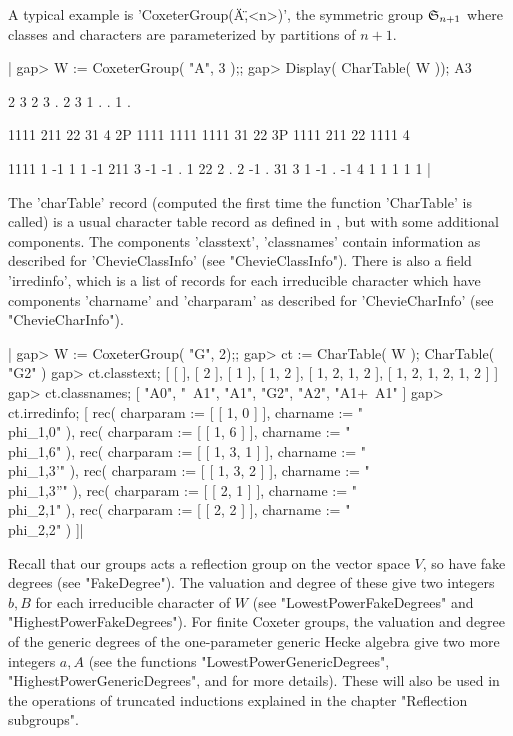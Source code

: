 A   typical  example  is  'CoxeterGroup(\"A\",<n>)',  the  symmetric  group
${\mathfrak S}_{n+1}$  where classes and characters  are parameterized by partitions
of $n+1$.

|    gap> W := CoxeterGroup( "A", 3 );;
    gap> Display( CharTable( W ));
    A3

          2    3    2    3    .  2
          3    1    .    .    1  .

            1111  211   22   31  4
         2P 1111 1111 1111   31 22
         3P 1111  211   22 1111  4

    1111       1   -1    1    1 -1
    211        3   -1   -1    .  1
    22         2    .    2   -1  .
    31         3    1   -1    . -1
    4          1    1    1    1  1
    |

The 'charTable' record (computed the first time the function 'CharTable' is
called) is a usual character table record as defined in \GAP, but with some
additional  components.  The  components  'classtext', 'classnames' contain
information  as  described  for  'ChevieClassInfo' (see "ChevieClassInfo").
There  is also  a field  'irredinfo', which  is a  list of records for each
irreducible  character which have components  'charname' and 'charparam' as
described for 'ChevieCharInfo' (see "ChevieCharInfo").

|    gap> W := CoxeterGroup( "G", 2);;
    gap> ct := CharTable( W );
    CharTable( "G2" )
    gap> ct.classtext;
    [ [  ], [ 2 ], [ 1 ], [ 1, 2 ], [ 1, 2, 1, 2 ], [ 1, 2, 1, 2, 1, 2 ] ]
    gap> ct.classnames;
    [ "A0", "~A1", "A1", "G2", "A2", "A1+~A1" ]
    gap> ct.irredinfo;
    [ rec(
          charparam := [ [ 1, 0 ] ],
          charname := "\\phi_{1,0}" ), rec(
          charparam := [ [ 1, 6 ] ],
          charname := "\\phi_{1,6}" ), rec(
          charparam := [ [ 1, 3, 1 ] ],
          charname := "\\phi_{1,3}'" ), rec(
          charparam := [ [ 1, 3, 2 ] ],
          charname := "\\phi_{1,3}''" ), rec(
          charparam := [ [ 2, 1 ] ],
          charname := "\\phi_{2,1}" ), rec(
          charparam := [ [ 2, 2 ] ],
          charname := "\\phi_{2,2}" ) ]|

Recall  that our groups acts a reflection group on the vector space $V$, so
have  fake degrees  (see "FakeDegree").  The valuation  and degree of these
give  two  integers  $b,B$  for  each  irreducible  character  of  $W$ (see
"LowestPowerFakeDegrees" and "HighestPowerFakeDegrees"). For finite Coxeter
groups,   the  valuation  and   degree  of  the   generic  degrees  of  the
one-parameter  generic Hecke algebra give two  more integers $a,A$ (see the
functions  "LowestPowerGenericDegrees",  "HighestPowerGenericDegrees",  and
\cite[Ch.11]  {Car85} for  more details).  These will  also be  used in the
operations  of truncated  inductions explained  in the  chapter "Reflection
subgroups".

